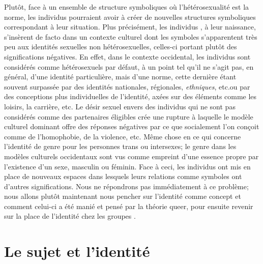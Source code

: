 Plutôt, face à un ensemble de structure symboliques où l'hétérosexualité est la norme, les individus \lgbt{} pourraient avoir à créer de nouvelles structures symboliques correspondant à leur situation.
Plus précisément, les individus \lgbt{}, à leur naissance, s'insèrent de facto dans un contexte culturel dont les symboles s'apparentent très peu aux identités sexuelles non hétérosexuelles, celles-ci portant plutôt des significations négatives.
En effet, dans le contexte occidental, les individus sont considérés comme hétérosexuels par défaut, à un point tel qu'il ne s'agit pas, en général, d'une identité particulière, mais d'une norme, cette dernière étant souvent surpassée par des identités nationales, régionales, \emph{ethniques}, etc.\@ ou par des conceptions plus individuelles de l'identité, axées sur des éléments comme les loisirs, la carrière, etc.
Le désir sexuel envers des individus qui ne sont pas considérés comme des partenaires éligibles crée une rupture à laquelle le modèle culturel dominant offre des réponses négatives par ce que socialement l'on conçoit comme de l'homophobie, de la violence, etc.
Même chose en ce qui concerne l'identité de genre pour les personnes trans ou intersexes; le genre dans les modèles culturels occidentaux sont vus comme empreint d'une essence propre par l'existence d'un sexe, masculin ou féminin.
Face à ceci, les individus \lgbt{} ont mis en place de nouveaux espaces dans lesquels leurs relations comme symboles ont d'autres significations.
Nous ne répondrons pas immédiatement à ce problème; nous allons plutôt maintenant nous pencher sur l'identité comme concept et comment celui-ci a été manié et pensé par la théorie queer, pour ensuite revenir sur la place de l'identité chez les groupes \lgbt{}.

\section{Le sujet et l'identité}
\label{sec:sujet_et_identite}

